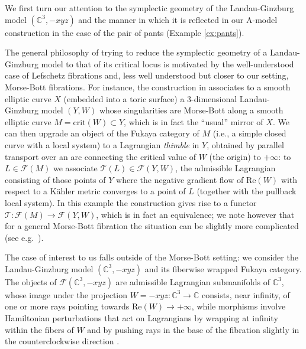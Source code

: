 \documentclass[11pt,leqno]{amsart}
\numberwithin{equation}{section}
\def\C{\mathbb{C}}
\def\crit{\mathrm{crit}}
\def\Re{\mathrm{Re}}
\def\F{{\mathcal F}}
\begin{document}
We first turn our attention to the symplectic geometry of 
the Landau-Ginzburg model $(\C^3,-xyz)$ and the manner in which it is
reflected in our A-model construction in the case of the pair of pants (Example
\ref{ex:pants}). 

The general philosophy of trying to reduce the symplectic geometry of
a Landau-Ginzburg model to that of its critical locus
is motivated by the well-understood case of Lefschetz fibrations and, less
well understood but closer to our setting, Morse-Bott fibrations.
For instance, the construction in \cite{AAK} associates to
a smooth elliptic curve $X$ (embedded into a toric surface) a 
3-dimensional Landau-Ginzburg model $(Y,W)$ whose singularities are
Morse-Bott along a smooth elliptic curve $M=\crit(W)\subset Y$, which 
is in fact the ``usual'' mirror of $X$. We can then upgrade an object
of the Fukaya category of $M$ (i.e., a simple closed curve with a local
system) to a Lagrangian {\em thimble} in $Y$, obtained by parallel transport
over an arc connecting the critical value of $W$ (the origin) to $+\infty$:
to $L\in \F(M)$ we associate $\mathcal{T}(L)\in \F(Y,W)$, the admissible
Lagrangian consisting of those points of $Y$ where the negative gradient flow of 
$\Re(W)$ with respect to a K\"ahler metric converges to a point of $L$
(together with the pullback local system). In this example the construction
gives rise to a functor $\mathcal{T}:\F(M)\to \F(Y,W)$, which is in fact an
equivalence; we note however that for a general Morse-Bott fibration the
situation can be slightly more complicated (see e.g.\ \cite[Corollary 7.8]{AAK}).

The case of interest to us falls outside of the Morse-Bott setting:
we consider the Landau-Ginzburg model $(\C^3,-xyz)$ and its fiberwise 
wrapped Fukaya category. The objects of $\F(\C^3,-xyz)$ are admissible Lagrangian 
submanifolds of $\C^3$, whose image under the projection $W=-xyz:\C^3\to \C$
consists, near infinity, of one or more rays pointing towards $\Re(W)\to
+\infty$, while morphisms involve Hamiltonian perturbations that act on
Lagrangians by wrapping at infinity within the fibers of $W$ and by pushing
rays in the base of the fibration slightly in the counterclockwise direction
\cite{AA}. 
\end{document}
